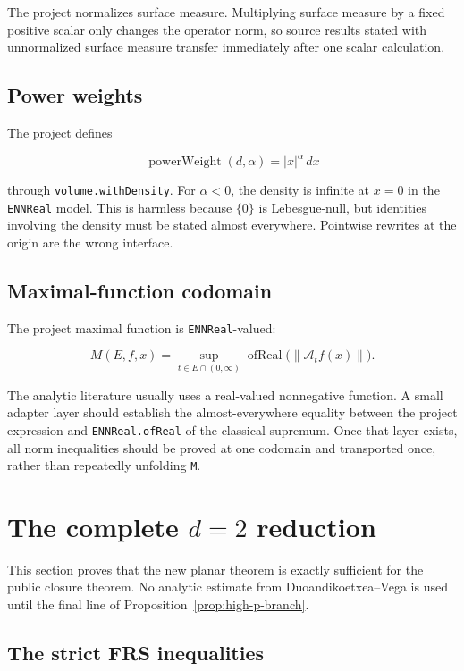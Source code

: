 \documentclass[11pt,a4paper]{article}
\theoremstyle{definition}
\theoremstyle{remark}
\newcommand{\A}{\mathcal{A}}
\newcommand{\norm}[1]{\left\lVert #1\right\rVert}
\newcommand{\abs}[1]{\left\lvert #1\right\rvert}
\newcommand{\lean}{\texttt}
\begin{document}
The project normalizes surface measure.  Multiplying surface measure by a fixed
positive scalar only changes the operator norm, so source results stated with
unnormalized surface measure transfer immediately after one scalar calculation.

\subsection{Power weights}

The project defines

\[
\operatorname{powerWeight}(d,\alpha)
=
\abs{x}^{\alpha}\,dx
\]

through \lean{volume.withDensity}.  For $\alpha<0$, the density is infinite at
$x=0$ in the \lean{ENNReal} model.  This is harmless because $\{0\}$ is
Lebesgue-null, but identities involving the density must be stated almost
everywhere.  Pointwise rewrites at the origin are the wrong interface.

\subsection{Maximal-function codomain}

The project maximal function is \lean{ENNReal}-valued:

\[
M(E,f,x)=\sup_{t\in E\cap(0,\infty)}
\operatorname{ofReal}\bigl(\norm{\A_t f(x)}\bigr).
\]

The analytic literature usually uses a real-valued nonnegative function.  A
small adapter layer should establish the almost-everywhere equality between the
project expression and \lean{ENNReal.ofReal} of the classical supremum.  Once
that layer exists, all norm inequalities should be proved at one codomain and
transported once, rather than repeatedly unfolding \lean{M}.

\section{The complete $d=2$ reduction}

This section proves that the new planar theorem is exactly sufficient for the
public closure theorem.  No analytic estimate from Duoandikoetxea--Vega is used
until the final line of Proposition~\ref{prop:high-p-branch}.

\subsection{The strict FRS inequalities}
\end{document}
